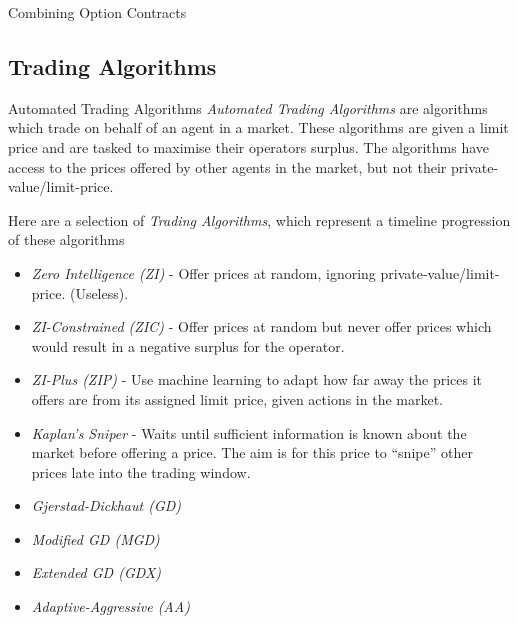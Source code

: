 \documentclass[11pt,a4paper]{article}
\begin{document}
  \begin{remark}{Combining Option Contracts}

  \end{remark}

\subsection{Trading Algorithms} \label{sec_TradingAlgorithms}

  \begin{definition}{Automated Trading Algorithms}
    \textit{Automated Trading Algorithms} are algorithms which trade on behalf of an agent in a market. These algorithms are given a limit price and are tasked to maximise their operators surplus. The algorithms have access to the prices offered by other agents in the market, but not their private-value/limit-price.
    \par Here are a selection of \textit{Trading Algorithms}, which represent a timeline progression of these algorithms
    \begin{itemize}
      \item \textit{Zero Intelligence (ZI)} - Offer prices at random, ignoring private-value/limit-price. (Useless).
      \item \textit{ZI-Constrained (ZIC)} - Offer prices at random but never offer prices which would result in a negative surplus for the operator.
      \item \textit{ZI-Plus (ZIP)} - Use machine learning to adapt how far away the prices it offers are from its assigned limit price, given actions in the market.
      \item \textit{Kaplan's Sniper} - Waits until sufficient information is known about the market before offering a price. The aim is for this price to ``snipe'' other prices late into the trading window.
      \item \textit{Gjerstad-Dickhaut (GD)}
      \item \textit{Modified GD (MGD)}
      \item \textit{Extended GD (GDX)}
      \item \textit{Adaptive-Aggressive (AA)}
    \end{itemize}
  \end{definition}
\end{document}
